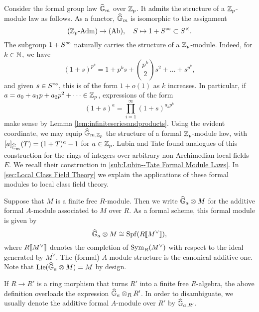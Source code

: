\documentclass[../main.tex]{subfiles}
\begin{document}
\begin{xpl}
  Consider the formal group law $\widehat{\mathbb{G}}_m$ over $\mathbb{Z}_p$. It   admits the structure of a $\mathbb{Z}_p$-module law as follows. 
  As a functor, $\widehat{\mathbb{G}}_m$ is isomorphic to the assignment
  \begin{equation*}
    {({\mathbb{Z}_p}\textnormal-\allowbreak\mathrm{Adm})} \to {(\mathrm{Ab})}, \quad S \mapsto 1 + S^{\circ \hspace{-0.5pt} \circ} \subset S^\times.
  \end{equation*}
  The subgroup $1 + S^{\circ \hspace{-0.5pt} \circ}$ naturally carries the structure of a $\mathbb{Z}_p$-module.
  Indeed, for $k \in \mathbb{N}$, we have
  \begin{equation*}
    (1+s)^{p^k} = 1 + p^ks + \binom{p^k}2 s^2 + \dots + s^{p^k},
  \end{equation*}
  and given $s \in S^{\circ \hspace{-0.5pt} \circ}$, this is of the form $1+ o(1)$ as $k$ increases. 
  In particular, if $a = a_0 + a_1 p + a_2p^2 + \dots \in \mathbb{Z}_p$, expressions of  the form
  \begin{equation*}
    (1+s)^a = \prod_{i = 1}^\infty (1+s)^{a_k p^k}
  \end{equation*}
  make sense by Lemma \ref{lem:infiniteseriesandproducts}. 
  Using the evident coordinate, we may equip $\widehat{\mathbb{G}}_{m,\mathbb{Z}_p}$ the structure of a formal $\mathbb{Z}_p$-module law, with
  $[a]_{\widehat{\mathbb{G}}_m}(T) = (1+T)^a -1$ for $a \in \mathbb{Z}_p$. 
  Lubin and Tate found analogues of this construction for the rings of integers 
  over arbitrary non-Archimedian local fields $E$. We recall their construction in 
  \cref{sub:Lubin--Tate Formal Module Laws}. In  \cref{sec:Local Class
  Field Theory} we explain the applications of these formal modules to local class
  field theory.
\end{xpl}


\begin{defi}
  \label{def:additiveformalmoduleassociatedtomodule}
  Suppose that $M$ is a finite free $R$-module. Then we write $\widehat{\mathbb{G}}_a \otimes M$ for the additive formal $A$-module associated to $M$ over $R$.
  As a formal scheme, this formal module is given by
  \begin{equation*}
    \widehat{\mathbb{G}}_a \otimes M \cong \operatorname{Spf}(R \llbracket M^\vee \rrbracket),
  \end{equation*}
  where $R \llbracket M^\vee \rrbracket$ denotes the completion of $\operatorname{Sym}_R(M^\vee)$ with respect to the ideal generated by $M^\vee$. The (formal) $A$-module structure is the
  canonical additive one. 
  Note that $\operatorname{Lie}(\widehat{\mathbb{G}}_a \otimes M) = M$ by design. 
  \end{defi}
\begin{rmk} 
  If $R\to R'$ is a ring morphism that turns $R'$ into a finite free
  $R$-algebra, the above definition overloads the expression $\widehat{\mathbb{G}}_a \otimes_R R'$.
  In order to disambiguate, we usually denote the additive formal $A$-module
  over $R'$ by $\widehat{\mathbb{G}}_{a, R'}$. 
\end{rmk}
\end{document}
